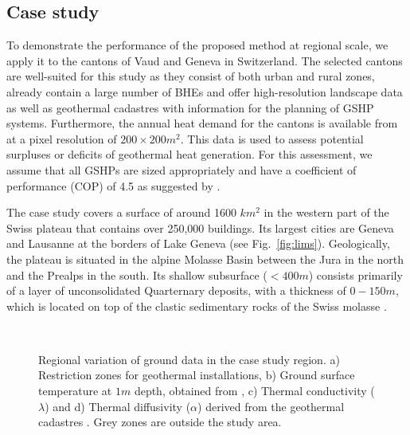 \subsection{Case study}
\label{case_study}

To demonstrate the performance of the proposed method at regional scale, we apply it to the cantons of Vaud and Geneva in Switzerland. 
The selected cantons are well-suited for this study as they consist of both urban and rural zones, already contain a large number of BHEs
and offer high-resolution landscape data as well as geothermal cadastres with information for the planning of GSHP systems.
Furthermore, the annual heat demand for the cantons is available from \citet{schneider_spatialtemporal_2017} at a pixel resolution of $200 \times 200 m^2$. 
This data is used to assess potential surpluses or deficits of geothermal heat generation.
For this assessment, we assume that all GSHPs are sized appropriately and have a coefficient of performance (COP) of 4.5 as suggested by \citet{galgaro_empirical_2015}.

The case study covers a surface of around 1600 $km^2$ in the western part of the Swiss plateau that contains over 250,000 buildings. 
Its largest cities are Geneva and Lausanne at the borders of Lake Geneva (see Fig.~\ref{fig:lims}).
Geologically, the plateau is situated in the alpine Molasse Basin between the Jura in the north and the Prealps in the south. 
Its shallow subsurface ($< 400m$) consists primarily of a layer of unconsolidated Quarternary deposits, with a thickness of $0 - 150m$, which is located on top of the clastic sedimentary rocks of the Swiss molasse \cite{allenbach_geomol_2105}. %

\begin{figure}[!ht] %
\centering
{} \\
\caption{Regional variation of ground data in the case study region. a) Restriction zones for geothermal installations, b) Ground surface temperature at $1m$ depth, obtained from \citet{assouline_machine_2019}, c) Thermal conductivity ($\lambda$) and d) Thermal diffusivity ($\alpha$) derived from the geothermal cadastres \cite{asit_vd_cadastre_2019, sitg_cadastre_2019}. Grey zones are outside the study area.}
\label{fig:data}
\end{figure}

